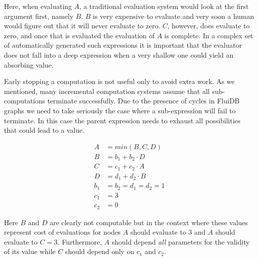 Here, when evaluating \(A\), a traditional evaluation system would
look at the first argument first, namely \(B\). \(B\) is very
expensive to evaluate and very soon a human would figure out that it
will never evaluate to zero. \(C\), however, does evaluate to zero,
and once that is evaluated the evaluation of \(A\) is complete. In a
complex set of automatically generated such expressions it is
important that the evaluator does not fall into a deep expression when
a very shallow one could yield an absorbing value.

Early stopping a computation is not useful only to avoid extra
work. As we mentioned, many incremental computation systems assume
that all sub-computations terminate successfully. Due to the presence
of cycles in FluiDB graphs we need to take seriously the case where a
sub-expression will fail to terminate. In this case the parent
expression needs to exhaust all possibilities that could lead to a
value.

\begin{align*}
A &= min(B, C, D) \\
B &= b_1 + b_2 \cdot D \\
C &= c_1 + c_2 \cdot A \\
D &= d_1 + d_2 \cdot B \\
b_1 &= b_2 = d_1 = d_2 = 1 \\
c_1 &= 3 \\
c_2 &= 0
\end{align*}

Here \(B\) and \(D\) are clearly not computable but in the context
where these values represent cost of evaluations for nodes \(A\)
should evaluate to 3 and \(A\) should evaluate to \(C =
3\). Furthermore, \(A\) should depend \emph{all} parameters for the
validity of its value while \(C\) should depend only on \(c_1\) and
\(c_2\).


